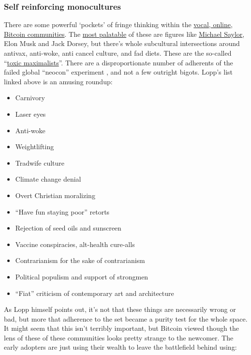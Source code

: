 \subsubsection{Self reinforcing monocultures}
There are some powerful `pockets' of fringe thinking within the \href{https://pourteaux.substack.com/p/bitcoin-culture-burn-it-to-the-ground?}{vocal, online, Bitcoin communities}. The \href{https://www.forbes.com/sites/peterizzo/2022/07/04/bitcoin-maximalism-is-dead-long-live-bitcoin-maximalism/?}{most palatable} of these are figures like \href{https://www.saylor.org/about/}{Michael Saylor}, Elon Musk and Jack Dorsey, but there's whole subcultural intersections around antivax, anti-woke, anti cancel culture, and fad diets. These are the so-called ``\href{https://blog.lopp.net/history-of-bitcoin-maximalism/}{toxic maximalists}''. There are a disproportionate number of adherents of the failed global ``neocon'' experiment \cite{va2010neoconservatism}, and not a few outright bigots. Lopp's list linked above is an amusing roundup:
\begin{itemize}
\item Carnivory
\item Laser eyes
\item Anti-woke
\item Weightlifting
\item Tradwife culture
\item Climate change denial
\item Overt Christian moralizing
\item ``Have fun staying poor'' retorts
\item Rejection of seed oils and sunscreen
\item Vaccine conspiracies, alt-health cure-alls
\item Contrarianism for the sake of contrarianism
\item Political populism and support of strongmen
\item ``Fiat'' criticism of contemporary art and architecture
\end{itemize}
As Lopp himself points out, it's not that these things are necessarily wrong or bad, but more that adherence to the set became a purity test for the whole space. It might seem that this isn't terribly important, but Bitcoin viewed though the lens of these of these communities looks pretty strange to the newcomer. The early adopters are just using their wealth to leave the battlefield behind using:
